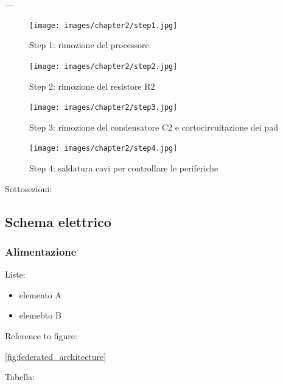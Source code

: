 ---

\begin{figure}[H]
    \centering
    \begin{minipage}[b]{0.45\textwidth}
      \texttt{[image: images/chapter2/step1.jpg]}
      \caption{Step 1: rimozione del processore}\label{fig:step1}
    \end{minipage}
    \hfill
    \begin{minipage}[b]{0.45\textwidth}
      \texttt{[image: images/chapter2/step2.jpg]}
      \caption{Step 2: rimozione del resistore R2}\label{fig:step2}
      \end{minipage}
  \end{figure}
  
  \begin{figure}[H]
    \centering
    \begin{minipage}[b]{0.45\textwidth}
      \texttt{[image: images/chapter2/step3.jpg]}
      \caption{Step 3: rimozione del condensatore C2 e cortocircuitazione dei pad}\label{fig:step2}  
    \end{minipage}
    \hfill
    \begin{minipage}[b]{0.45\textwidth}
      \texttt{[image: images/chapter2/step4.jpg]}
      \caption{Step 4: saldatura cavi per controllare le periferiche}\label{fig:step2}
        \end{minipage}
\end{figure}

Sottosezioni:

\subsection{Schema elettrico}

\subsubsection{Alimentazione}

Liste:

\begin{itemize}
  \setlength{\itemsep}{2pt}
  \setlength{\parskip}{2pt}
  \item elemento A
  \item elemebto B
\end{itemize}


Reference to figure:

\ref{fig:federated_architecture}

Tabella:

